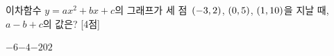 이차함수 $y=ax^2+bx+c$의 그래프가 세 점~$(-3{,}\mkern3mu 2)$, $(0{,}\mkern3mu 5)$, $(1{,}\mkern3mu 10)$을 지날 때, $a-b+c$의 값은?  \mbox{[4점]}
\begin{choices32}{$-6$}{$-4$}{$-2$}{$0$}{$2$}\end{choices32}

